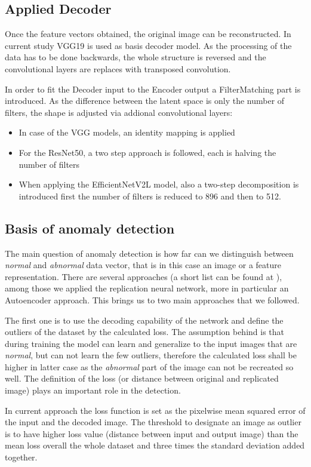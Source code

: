 \subsection{Applied Decoder}
Once the feature vectors obtained, the original image can be reconstructed.
In current study VGG19 is used as basis decoder model.
As the processing of the data has to be done backwards, the whole structure is
reversed and the convolutional layers are replaces with transposed convolution.

In order to fit the Decoder input to the Encoder output a FilterMatching part is introduced.
As the difference between the latent space is only the number of filters,
the shape is adjusted via addional convolutional layers:
\begin{itemize}
    \item In case of the VGG models, an identity mapping is applied
    \item For the ResNet50, a two step approach is followed, each is halving the number of filters
    \item When applying the EfficientNetV2L model, also a two-step decomposition is introduced
          first the number of filters is reduced to 896 and then to 512.
\end{itemize}

\subsection{Basis of anomaly detection}
The main question of anomaly detection is how far can we distinguish between \emph{normal}
and \emph{abnormal} data vector, that is in this case an image or a feature representation.
There are several approaches (a short list can be found at \cite{_anomaly_2023}), among those
we applied the replication neural network, more in particular an Autoencoder approach.
This brings us to two main approaches that we followed.

The first one is to use the decoding capability of the network and define the outliers of the
dataset by the calculated loss.
The assumption behind is that during training the model can learn and generalize to the input
images that are \emph{normal}, but can not learn the few outliers, therefore the calculated loss
shall be higher in latter case as the \emph{abnormal} part of the image can not be recreated so well.
The definition of the loss (or distance between original and replicated image) plays an important
role in the detection.

In current approach the loss function is set as the pixelwise mean squared error of the input
and the decoded image.
The threshold to designate an image as outlier is to have higher loss value
(distance between input and output image) than the mean loss overall the whole dataset and
three times the standard deviation added together.

